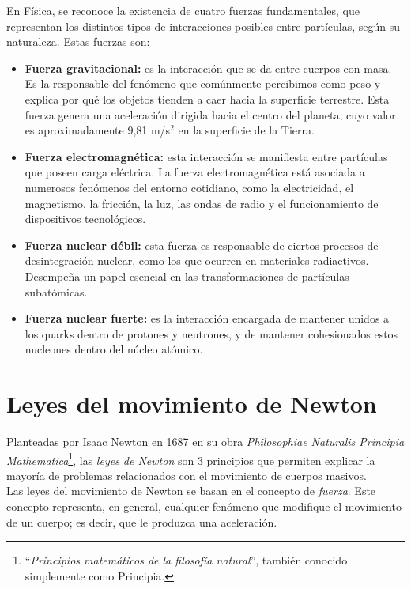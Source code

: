 En Física, se reconoce la existencia de cuatro fuerzas fundamentales, que representan los distintos tipos de interacciones posibles entre partículas, según su naturaleza. Estas fuerzas son:

\begin{itemize} \item[$\bullet$] \textbf{Fuerza gravitacional:} es la interacción que se da entre cuerpos con masa. Es la responsable del fenómeno que comúnmente percibimos como peso y explica por qué los objetos tienden a caer hacia la superficie terrestre. Esta fuerza genera una aceleración dirigida hacia el centro del planeta, cuyo valor es aproximadamente 9,81 m/s$^{2}$ en la superficie de la Tierra.

\item[$\bullet$] \textbf{Fuerza electromagnética:} esta interacción se manifiesta entre partículas que poseen carga eléctrica. La fuerza electromagnética está asociada a numerosos fenómenos del entorno cotidiano, como la electricidad, el magnetismo, la fricción, la luz, las ondas de radio y el funcionamiento de dispositivos tecnológicos.

\item[$\bullet$] \textbf{Fuerza nuclear débil:} esta fuerza es responsable de ciertos procesos de desintegración nuclear, como los que ocurren en materiales radiactivos. Desempeña un papel esencial en las transformaciones de partículas subatómicas.

\item[$\bullet$] \textbf{Fuerza nuclear fuerte:} es la interacción encargada de mantener unidos a los quarks dentro de protones y neutrones, y de mantener cohesionados estos nucleones dentro del núcleo atómico. \end{itemize}

\section{Leyes del movimiento de Newton}

Planteadas por Isaac Newton en 1687 en su obra \textit{Philosophiae Naturalis Principia Mathematica}\footnote{``\textit{Principios matem\'aticos de la filosof\'ia natural}'', tambi\'en conocido simplemente como Principia.}, las \textit{leyes de Newton} son 3 principios que permiten explicar la mayor\'ia de problemas relacionados con el movimiento de  cuerpos masivos. \\[.35cm]

Las leyes del movimiento de Newton se basan en el concepto de \textit{fuerza}. Este concepto representa, en general, cualquier fen\'omeno que modifique el movimiento de un cuerpo; es decir, que le produzca una aceleraci\'on.


